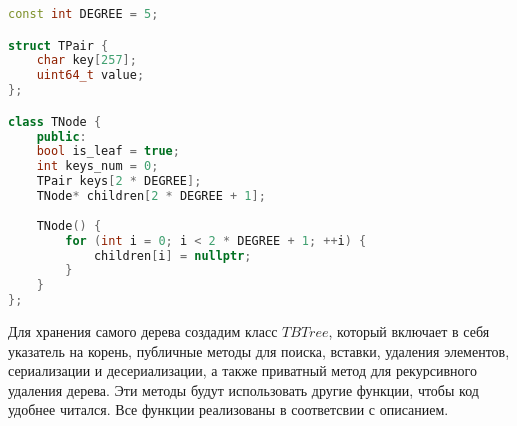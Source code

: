\begin{lstlisting}[language=C++]
const int DEGREE = 5;

struct TPair {
	char key[257];
	uint64_t value;
};

class TNode {
	public:
	bool is_leaf = true;
	int keys_num = 0;
	TPair keys[2 * DEGREE];
	TNode* children[2 * DEGREE + 1];
	
	TNode() {
		for (int i = 0; i < 2 * DEGREE + 1; ++i) {
			children[i] = nullptr;
		}
	}
};
\end{lstlisting}

Для хранения самого дерева создадим класс $TBTree$, который включает в себя указатель на корень, публичные методы для поиска, 
вставки, удаления элементов, сериализации и десериализации, а также приватный метод для рекурсивного удаления дерева. Эти методы
будут использовать другие функции, чтобы код удобнее читался. Все функции реализованы в соответсвии с описанием. 

